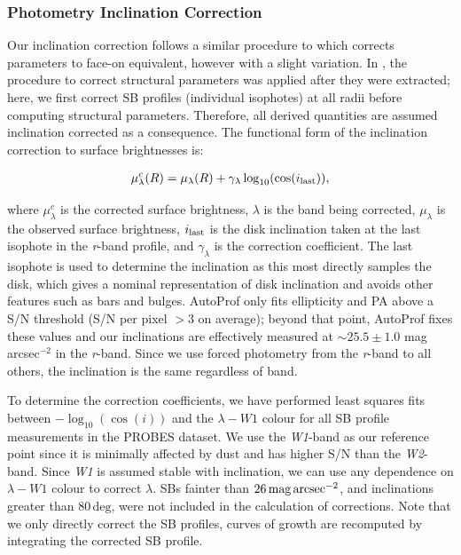 \documentclass[twocolumn]{aastex631}
\newcommand{\wunits}[2]{\ensuremath{#1\,\text{#2}}}
\newcommand{\magss}{{mag{\,}arcsec\ensuremath{^{-2}}}\xspace}
\begin{document}
\subsubsection{Photometry Inclination Correction}
\label{sec:inclinationcorrection}

Our inclination correction follows a similar procedure to \citet{Stone2021a} which corrects parameters to face-on equivalent, however with a slight variation. 
In \citet{Stone2021a}, the procedure to correct structural parameters was applied after they were extracted; here, we first correct SB profiles (individual isophotes) at all radii before computing structural parameters.
Therefore, all derived quantities are assumed inclination corrected as a consequence.
The functional form of the inclination correction to surface brightnesses is:

\begin{eqnarray}
    \mu_{\lambda}^c(R) = \mu_{\lambda}(R) + \gamma_{\lambda}\log_{10}(\cos(i_{\rm last})),  
\end{eqnarray}

where $\mu_{\lambda}^c$ is the corrected surface brightness, $\lambda$ is the band being corrected, $\mu_{\lambda}$ is the observed surface brightness, $i_{\rm last}$ is the disk inclination taken at the last isophote in the {\it r}-band profile, and $\gamma_{\lambda}$ is the correction coefficient.
The last isophote is used to determine the inclination as this most directly samples the disk, which gives a nominal representation of disk inclination and avoids other features such as bars and bulges.
AutoProf only fits ellipticity and PA above a S/N threshold (S/N per pixel $>3$ on average); beyond that point, AutoProf fixes these values and our inclinations are effectively measured at $\sim 25.5 \pm 1.0$ \magss in the {\it r}-band.
Since we use forced photometry from the {\it r}-band to all others, the inclination is the same regardless of band.

To determine the correction coefficients, we have performed least squares fits between $-\log_{10}(\cos(i))$ and the $\lambda - W1$ colour for all SB profile measurements in the PROBES dataset.
We use the {\it W1}-band as our reference point since it is minimally affected by dust and has higher S/N than the {\it W2}-band.
Since {\it W1} is assumed stable with inclination, we can use any dependence on $\lambda - W1$ colour to correct $\lambda$.
SBs fainter than \wunits{26}{\magss}, and inclinations greater than \wunits{80}{deg}, were not included in the calculation of corrections. 
Note that we only directly correct the SB profiles, curves of growth are recomputed by integrating the corrected SB profile.
\end{document}

